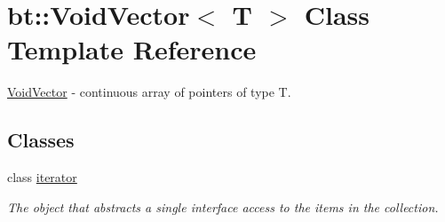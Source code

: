 \hypertarget{classbt_1_1_void_vector}{\section{bt\-:\-:Void\-Vector$<$ T $>$ Class Template Reference}
\label{classbt_1_1_void_vector}
}


\hyperlink{classbt_1_1_void_vector}{Void\-Vector} -\/ continuous array of pointers of type T.  


\subsection*{Classes}
\begin{DoxyCompactItemize}
\item 
class \hyperlink{classbt_1_1_void_vector_1_1iterator}{iterator}
\begin{DoxyCompactList}\small\item\em The object that abstracts a single interface access to the items in the collection. \end{DoxyCompactList}\end{DoxyCompactItemize}
